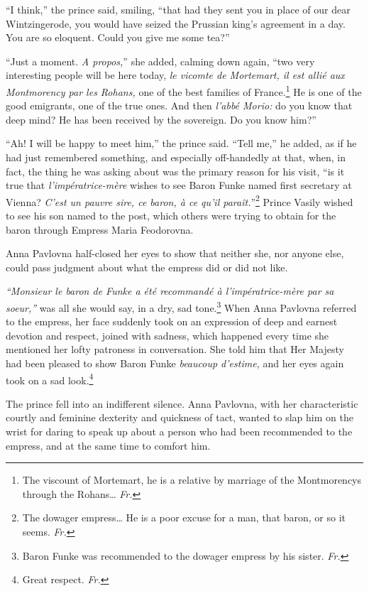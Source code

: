 ``I think,'' the prince said, smiling, ``that had they sent you in place of our dear Wintzingerode, you would have seized the Prussian king's agreement in a day. You are so eloquent. Could you give me some tea?'' %

``Just a moment. \textit{A propos,}'' she added, calming down again, ``two very interesting people will be here today, \textit{le vicomte de Mortemart, il est alli\'e aux Montmorency par les Rohans,} one of the best families of France.\footnote{The viscount of Mortemart, he is a relative by marriage of the Montmorencys through the Rohans\ldots{} \textit{Fr.}} He is one of the good emigrants, one of the true ones. And then \textit{l'abb\'e Morio:} do you know that deep mind? He has been received by the sovereign. Do you know him?'' %

``Ah! I will be happy to meet him,'' the prince said. ``Tell me,'' he added, as if he had just remembered something, and especially off-handedly at that, when, in fact, the thing he was asking about was the primary reason for his visit, ``is it true that \textit{l'imp\'eratrice-m\`ere} wishes to see Baron Funke named first secretary at Vienna? \textit{C'est un pauvre sire, ce baron, \`a ce qu'il para\^it.}''\footnote{The dowager empress\ldots{} He is a poor excuse for a man, that baron, or so it seems. \textit{Fr.}} Prince Vasily wished to see his son named to the post, which others were trying to obtain for the baron through Empress Maria Feodorovna. %

Anna Pavlovna half-closed her eyes to show that neither she, nor anyone else, could pass judgment about what the empress did or did not like.

\textit{``Monsieur le baron de Funke a \'et\'e recommand\'e \`a l'imp\'eratrice-m\`ere par sa soeur,''} was all she would say, in a dry, sad tone.\footnote{Baron Funke was recommended to the dowager empress by his sister. \textit{Fr.}} When Anna Pavlovna referred to the empress, her face suddenly took on an expression of deep and earnest devotion and respect, joined with sadness, which happened every time she mentioned her lofty patroness in conversation. She told him that Her Majesty had been pleased to show Baron Funke \textit{beaucoup d'estime,} and her eyes again took on a sad look.\footnote{Great respect. \textit{Fr.}} %

The prince fell into an indifferent silence. Anna Pavlovna, with her characteristic courtly and feminine dexterity and quickness of tact, wanted to slap him on the wrist for daring to speak up about a person who had been recommended to the empress, and at the same time to comfort him.

